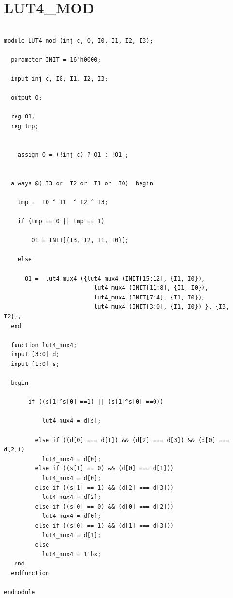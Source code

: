 \documentclass[a4paper,openright,12pt]{report}
\begin{document}
\section{LUT4\_MOD}
\begin{lstlisting}

module LUT4_mod (inj_c, O, I0, I1, I2, I3);

  parameter INIT = 16'h0000;

  input inj_c, I0, I1, I2, I3;

  output O;

  reg O1;
  reg tmp;

  
    assign O = (!inj_c) ? O1 : !O1 ;
	
	
  always @( I3 or  I2 or  I1 or  I0)  begin
 
    tmp =  I0 ^ I1  ^ I2 ^ I3;

    if (tmp == 0 || tmp == 1)

        O1 = INIT[{I3, I2, I1, I0}];

    else 
    
      O1 =  lut4_mux4 ({lut4_mux4 (INIT[15:12], {I1, I0}),
                          lut4_mux4 (INIT[11:8], {I1, I0}),
                          lut4_mux4 (INIT[7:4], {I1, I0}),
                          lut4_mux4 (INIT[3:0], {I1, I0}) }, {I3, I2});
  end

  function lut4_mux4;
  input [3:0] d;
  input [1:0] s;
   
  begin

       if ((s[1]^s[0] ==1) || (s[1]^s[0] ==0))
           
           lut4_mux4 = d[s];

         else if ((d[0] === d[1]) && (d[2] === d[3]) && (d[0] === d[2])) 
           lut4_mux4 = d[0];
         else if ((s[1] == 0) && (d[0] === d[1]))
           lut4_mux4 = d[0];
         else if ((s[1] == 1) && (d[2] === d[3])) 
           lut4_mux4 = d[2];
         else if ((s[0] == 0) && (d[0] === d[2])) 
           lut4_mux4 = d[0];
         else if ((s[0] == 1) && (d[1] === d[3]))
           lut4_mux4 = d[1];
         else
           lut4_mux4 = 1'bx;
   end
  endfunction

endmodule


\end{lstlisting}
\end{document}
